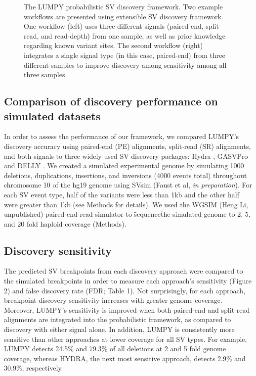 \documentclass[11pt]{article}
\begin{document}
\begin{figure}
\caption{The LUMPY probabilistic SV discovery framework. Two example workflows 
are presented using extensible SV discovery framework. One workflow (left) 
uses three different signals (paired-end, split-read, and read-depth) from one 
sample, as well as prior knowledge regarding known variant sites. The second
workflow (right) integrates a single signal type (in this case, paired-end) 
from three different samples to improve discovery among sensitivity among all
three samples.}
\label{workflow:fig}
\end{figure}

\subsection{Comparison of discovery performance on simulated datasets}
In order to assess the performance of our framework, we compared LUMPY's 
discovery accuracy using paired-end (PE) alignments, split-read (SR) alignments, 
and both signals to three widely used SV discovery packages: 
Hydra \cite{quinlan2010b}, GASVPro \cite{sindi2012} and 
DELLY \cite{rausch2012b}. We created a simulated experimental genome by 
simulating 1000 deletions, duplications, insertions, and inversions 
(4000 events total) throughout chromosome 10 of the hg19 genome 
using SVsim (Faust et al, \emph{in preparation}).  For each SV event type, half
of the variants were less than 1kb and the other half were greater than 1kb (see
Methods for details).  We used the WGSIM (Heng Li, unpublished) paired-end read 
simulator to \"sequence\" the simulated genome to 2, 5, and 20 fold 
haploid coverage (Methods).

\subsection{Discovery sensitivity}
The predicted SV breakpoints from each discovery approach were compared to the
simulated breakpoints in order to measure each approach's sensitivity (Figure 2) 
and false discovery rate (FDR; Table 1). Not surprisingly, for each approach,
breakpoint discovery sensitivity increases with greater genome coverage.
Moreover, LUMPY's sensitivity is improved when both paired-end and split-read
alignments are integrated into the probabilistic framework, as compared to 
discovery with either signal alone. In addition, LUMPY is consistently more
sensitive than other approaches at lower coverage for all SV types. For example,
LUMPY detects 24.5\% and 79.3\% of all deletions at 2 and 5 fold genome
coverage, whereas HYDRA, the next most sensitive approach, detects 2.9\% and
30.9\%, respectively. 
\end{document}
